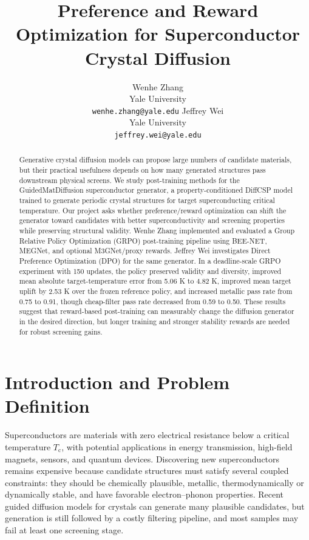 \documentclass{article}
\title{Preference and Reward Optimization for Superconductor Crystal Diffusion}
\author{
  Wenhe Zhang \\
  Yale University \\
  \texttt{wenhe.zhang@yale.edu}
  \And
  Jeffrey Wei \\
  Yale University \\
  \texttt{jeffrey.wei@yale.edu}
}
\newcommand{\Tc}{T_{\mathrm{c}}}
\begin{document}
\maketitle

\begin{abstract}
Generative crystal diffusion models can propose large numbers of candidate materials, but their practical usefulness depends on how many generated structures pass downstream physical screens. We study post-training methods for the GuidedMatDiffusion superconductor generator, a property-conditioned DiffCSP model trained to generate periodic crystal structures for target superconducting critical temperature. Our project asks whether preference/reward optimization can shift the generator toward candidates with better superconductivity and screening properties while preserving structural validity. Wenhe Zhang implemented and evaluated a Group Relative Policy Optimization (GRPO) post-training pipeline using BEE-NET, MEGNet, and optional M3GNet/proxy rewards. Jeffrey Wei investigates Direct Preference Optimization (DPO) for the same generator. In a deadline-scale GRPO experiment with 150 updates, the policy preserved validity and diversity, improved mean absolute target-temperature error from 5.06 K to 4.82 K, improved mean target uplift by 2.53 K over the frozen reference policy, and increased metallic pass rate from 0.75 to 0.91, though cheap-filter pass rate decreased from 0.59 to 0.50. These results suggest that reward-based post-training can measurably change the diffusion generator in the desired direction, but longer training and stronger stability rewards are needed for robust screening gains.
\end{abstract}

\section{Introduction and Problem Definition}
Superconductors are materials with zero electrical resistance below a critical temperature $\Tc$, with potential applications in energy transmission, high-field magnets, sensors, and quantum devices. Discovering new superconductors remains expensive because candidate structures must satisfy several coupled constraints: they should be chemically plausible, metallic, thermodynamically or dynamically stable, and have favorable electron--phonon properties. Recent guided diffusion models for crystals can generate many plausible candidates, but generation is still followed by a costly filtering pipeline, and most samples may fail at least one screening stage.
\end{document}
